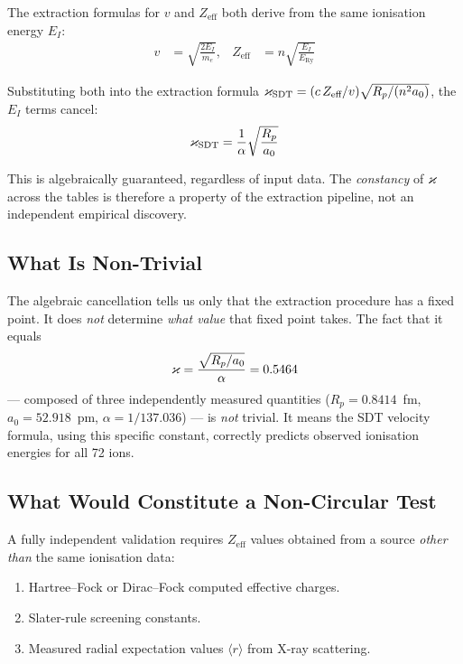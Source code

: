 The extraction formulas for $v$ and $Z_{\text{eff}}$ both derive from the same ionisation energy $E_I$:
\begin{align}
  v &= \sqrt{\frac{2 E_I}{m_e}}, &
  Z_{\text{eff}} &= n \sqrt{\frac{E_I}{E_{\text{Ry}}}}
\end{align}

Substituting both into the extraction formula $\varkappa_{\text{SDT}} = (c \, Z_{\text{eff}} / v) \sqrt{R_p / (n^2 a_0)}$, the $E_I$ terms cancel:
\begin{equation}
  \varkappa_{\text{SDT}} = \frac{1}{\alpha} \sqrt{\frac{R_p}{a_0}}
\end{equation}

This is algebraically guaranteed, regardless of input data.  The \emph{constancy} of $\varkappa$ across the tables is therefore a property of the extraction pipeline, not an independent empirical discovery.

\subsection{What Is Non-Trivial}

The algebraic cancellation tells us only that the extraction procedure has a fixed point.  It does \emph{not} determine \emph{what value} that fixed point takes.  The fact that it equals
\begin{equation}
  \varkappa = \frac{\sqrt{R_p / a_0}}{\alpha} = 0.5464
\end{equation}
--- composed of three independently measured quantities ($R_p = 0.8414$~fm, $a_0 = 52.918$~pm, $\alpha = 1/137.036$) --- is \emph{not} trivial.  It means the SDT velocity formula, using this specific constant, correctly predicts observed ionisation energies for all 72 ions.

\subsection{What Would Constitute a Non-Circular Test}

A fully independent validation requires $Z_{\text{eff}}$ values obtained from a source \emph{other than} the same ionisation data:
\begin{enumerate}
  \item Hartree--Fock or Dirac--Fock computed effective charges.
  \item Slater-rule screening constants.
  \item Measured radial expectation values $\langle r \rangle$ from X-ray scattering.
\end{enumerate}

